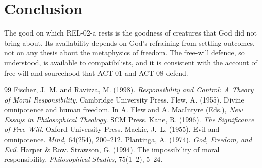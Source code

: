 \documentclass{situationist-preprint}
\begin{document}
\section{Conclusion}

The good on which REL-02-a rests is the goodness of creatures that God did not bring about. Its availability depends on God's refraining from settling outcomes, not on any thesis about the metaphysics of freedom. The free-will defence, so understood, is available to compatibilists, and it is consistent with the account of free will and sourcehood that ACT-01 and ACT-08 defend.

\begin{thebibliography}{99}\small
{} Fischer, J.~M. and Ravizza, M. (1998). \emph{Responsibility and Control: A Theory of Moral Responsibility}. Cambridge University Press.
 Flew, A. (1955). Divine omnipotence and human freedom. In A. Flew and A. MacIntyre (Eds.), \emph{New Essays in Philosophical Theology}. SCM Press.
 Kane, R. (1996). \emph{The Significance of Free Will}. Oxford University Press.
 Mackie, J.~L. (1955). Evil and omnipotence. \emph{Mind}, 64(254), 200--212.
 Plantinga, A. (1974). \emph{God, Freedom, and Evil}. Harper \& Row.
 Strawson, G. (1994). The impossibility of moral responsibility. \emph{Philosophical Studies}, 75(1--2), 5--24.
\end{thebibliography}
\end{document}
